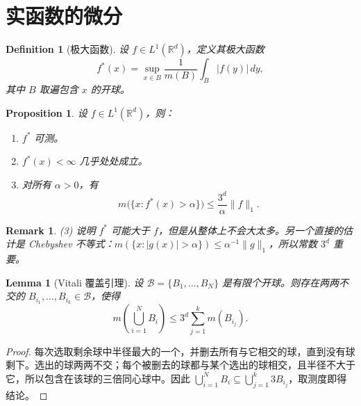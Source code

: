 \documentclass[12pt,letterpaper,twoside,openright]{ctexbook}
\theoremstyle{bluehead}
\newtheorem{proposition}[theorem]{Proposition}
\newtheorem{lemma}[theorem]{Lemma}
\theoremstyle{olivehead}
\newtheorem{definition}{Definition}
\theoremstyle{orangehead}
\theoremstyle{redremark}
\newtheorem*{remark}{Remark}
\begin{document}
\section{实函数的微分}

\begin{definition}[极大函数]
设 $f\in L^1(\mathbb R^d)$，定义其极大函数
\[
f^*(x)=\sup_{x\in B}\frac{1}{m(B)}\int_B|f(y)|\,dy,
\]
其中 $B$ 取遍包含 $x$ 的开球。
\end{definition}

\begin{proposition}\label{prop:maximal-function-weak-estimate}
设 $f\in L^1(\mathbb R^d)$，则：
\begin{enumerate}
\item[(1)] $f^*$ 可测。
\item[(2)] $f^*(x)<\infty$ 几乎处处成立。
\item[(3)] 对所有 $\alpha>0$，有
\[
m\bigl(\{x:f^*(x)>\alpha\}\bigr)\leq\frac{3^d}{\alpha}\|f\|_1.
\]
\end{enumerate}
\end{proposition}

\begin{remark}
(3) 说明 $f^*$ 可能大于 $f$，但是从整体上不会大太多。另一个直接的估计是 Chebyshev 不等式：$m(\{x:|g(x)|>\alpha\})\leq\alpha^{-1}\|g\|_1$，所以常数 $3^d$ 重要。
\end{remark}

\begin{lemma}[Vitali 覆盖引理]\label{lem:vitali-finite-balls}
设 $\mathcal B=\{B_1,\ldots,B_N\}$ 是有限个开球。则存在两两不交的 $B_{i_1},\ldots,B_{i_k}\in\mathcal B$，使得
\[
m\left(\bigcup_{i=1}^N B_i\right)\leq3^d\sum_{j=1}^k m(B_{i_j}).
\]
\end{lemma}

\begin{proof}
每次选取剩余球中半径最大的一个，并删去所有与它相交的球，直到没有球剩下。选出的球两两不交；每个被删去的球都与某个选出的球相交，且半径不大于它，所以包含在该球的三倍同心球中。因此 $\bigcup_{i=1}^N B_i\subseteq\bigcup_{j=1}^k3B_{i_j}$，取测度即得结论。
\end{proof}
\end{document}
